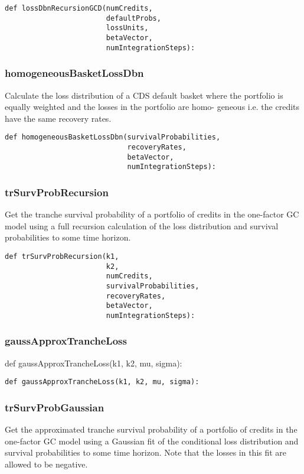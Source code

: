 \documentclass[twoside,11pt]{book}
\begin{document}
\begin{lstlisting}
def lossDbnRecursionGCD(numCredits,
                        defaultProbs,
                        lossUnits,
                        betaVector,
                        numIntegrationSteps):
\end{lstlisting}

\subsubsection*{{\bf homogeneousBasketLossDbn}}
Calculate the loss distribution of a CDS default basket where the portfolio is equally weighted and the losses in the portfolio are homo- geneous i.e. the credits have the same recovery rates.  

\begin{lstlisting}
def homogeneousBasketLossDbn(survivalProbabilities,
                             recoveryRates,
                             betaVector,
                             numIntegrationSteps):
\end{lstlisting}

\subsubsection*{{\bf trSurvProbRecursion}}
Get the tranche survival probability of a portfolio of credits in the one-factor GC model using a full recursion calculation of the loss distribution and survival probabilities to some time horizon.  

\begin{lstlisting}
def trSurvProbRecursion(k1,
                        k2,
                        numCredits,
                        survivalProbabilities,
                        recoveryRates,
                        betaVector,
                        numIntegrationSteps):
\end{lstlisting}

\subsubsection*{{\bf gaussApproxTrancheLoss}}
def gaussApproxTrancheLoss(k1, k2, mu, sigma): 

\begin{lstlisting}
def gaussApproxTrancheLoss(k1, k2, mu, sigma):
\end{lstlisting}

\subsubsection*{{\bf trSurvProbGaussian}}
Get the approximated tranche survival probability of a portfolio of credits in the one-factor GC model using a Gaussian fit of the conditional loss distribution and survival probabilities to some time horizon. Note that the losses in this fit are allowed to be negative.  
\end{document}
